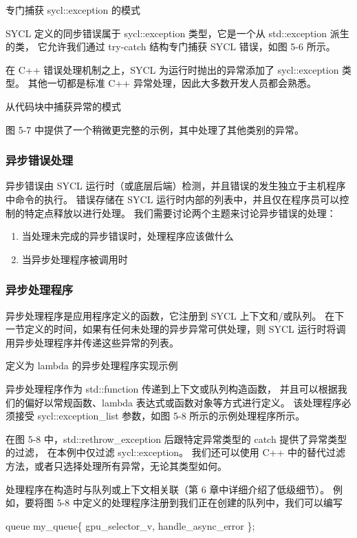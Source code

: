 {\color{red} 专门捕获 sycl::exception 的模式}

SYCL 定义的同步错误属于 sycl::exception 类型，它是一个从 std::exception 派生的类，
它允许我们通过 try-catch 结构专门捕获 SYCL 错误，如图 5-6 所示。

在 C++ 错误处理机制之上，SYCL 为运行时抛出的异常添加了 sycl::exception 类型。 
其他一切都是标准 C++ 异常处理，因此大多数开发人员都会熟悉。

{\color{red} 从代码块中捕获异常的模式}

图 5-7 中提供了一个稍微更完整的示例，其中处理了其他类别的异常。

\subsubsection{异步错误处理}
异步错误由 SYCL 运行时（或底层后端）检测，并且错误的发生独立于主机程序中命令的执行。 
错误存储在 SYCL 运行时内部的列表中，并且仅在程序员可以控制的特定点释放以进行处理。 
我们需要讨论两个主题来讨论异步错误的处理：

\begin{enumerate}
	\item 当处理未完成的异步错误时，处理程序应该做什么
	\item 当异步处理程序被调用时
\end{enumerate}

\subsubsection{异步处理程序}
异步处理程序是应用程序定义的函数，它注册到 SYCL 上下文和/或队列。 
在下一节定义的时间，如果有任何未处理的异步异常可供处理，则 SYCL 运行时将调用异步处理程序并传递这些异常的列表。

{\color{red} 定义为 lambda 的异步处理程序实现示例}

异步处理程序作为 std::function 传递到上下文或队列构造函数，
并且可以根据我们的偏好以常规函数、lambda 表达式或函数对象等方式进行定义。 
该处理程序必须接受 sycl::exception\_list 参数，如图 5-8 所示的示例处理程序所示。

在图 5-8 中，std::rethrow\_exception 后跟特定异常类型的 catch 提供了异常类型的过滤，
在本例中仅过滤 sycl::exception。 我们还可以使用 C++ 中的替代过滤方法，或者只选择处理所有异常，无论其类型如何。

处理程序在构造时与队列或上下文相关联（第 6 章中详细介绍了低级细节）。 
例如，要将图 5-8 中定义的处理程序注册到我们正在创建的队列中，我们可以编写

queue my\_queue\{ gpu\_selector\_v, handle\_async\_error \};

